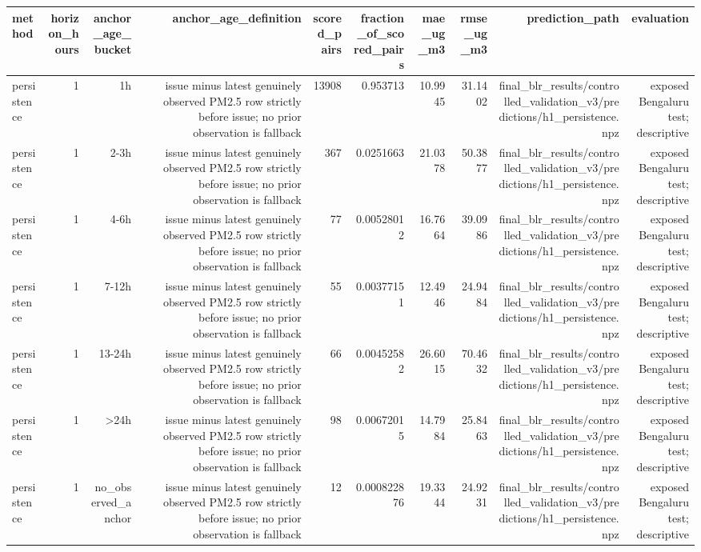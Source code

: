 \begin{tabular}{lrrrrrrrrr}
\hline
method & horizon\_hours & anchor\_age\_bucket & anchor\_age\_definition & scored\_pairs & fraction\_of\_scored\_pairs & mae\_ug\_m3 & rmse\_ug\_m3 & prediction\_path & evaluation \\
\hline
persistence & 1 & 1h & issue minus latest genuinely observed PM2.5 row strictly before issue; no prior observation is fallback & 13908 & 0.953713 & 10.9945 & 31.1402 & final\_blr\_results/controlled\_validation\_v3/predictions/h1\_persistence.npz & exposed Bengaluru test; descriptive \\
persistence & 1 & 2-3h & issue minus latest genuinely observed PM2.5 row strictly before issue; no prior observation is fallback & 367 & 0.0251663 & 21.0378 & 50.3877 & final\_blr\_results/controlled\_validation\_v3/predictions/h1\_persistence.npz & exposed Bengaluru test; descriptive \\
persistence & 1 & 4-6h & issue minus latest genuinely observed PM2.5 row strictly before issue; no prior observation is fallback & 77 & 0.00528012 & 16.7664 & 39.0986 & final\_blr\_results/controlled\_validation\_v3/predictions/h1\_persistence.npz & exposed Bengaluru test; descriptive \\
persistence & 1 & 7-12h & issue minus latest genuinely observed PM2.5 row strictly before issue; no prior observation is fallback & 55 & 0.00377151 & 12.4946 & 24.9484 & final\_blr\_results/controlled\_validation\_v3/predictions/h1\_persistence.npz & exposed Bengaluru test; descriptive \\
persistence & 1 & 13-24h & issue minus latest genuinely observed PM2.5 row strictly before issue; no prior observation is fallback & 66 & 0.00452582 & 26.6015 & 70.4632 & final\_blr\_results/controlled\_validation\_v3/predictions/h1\_persistence.npz & exposed Bengaluru test; descriptive \\
persistence & 1 & >24h & issue minus latest genuinely observed PM2.5 row strictly before issue; no prior observation is fallback & 98 & 0.00672015 & 14.7984 & 25.8463 & final\_blr\_results/controlled\_validation\_v3/predictions/h1\_persistence.npz & exposed Bengaluru test; descriptive \\
persistence & 1 & no\_observed\_anchor & issue minus latest genuinely observed PM2.5 row strictly before issue; no prior observation is fallback & 12 & 0.000822876 & 19.3344 & 24.9231 & final\_blr\_results/controlled\_validation\_v3/predictions/h1\_persistence.npz & exposed Bengaluru test; descriptive \\

\end{tabular}
